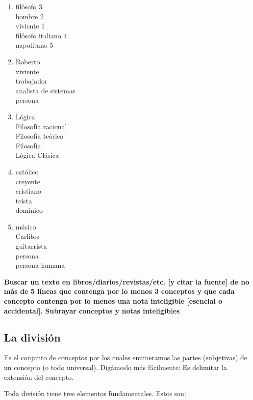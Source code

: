 \documentclass{article}
\begin{document}
\begin{enumerate}
    \item filósofo 3 \\
    hombre 2 \\
    viviente 1 \\
    filósofo italiano 4 \\
    napolitano  5 \\
                  
    \item Roberto \\
    viviente \\
    trabajador \\
    analista de sistemas \\
    persona \\
                  
    \item Lógica  \\
    Filosofía racional \\
    Filosofía teórica \\
    Filosofía \\
    Lógica Clásica \\
                  
    \item católico  \\
    creyente \\
    cristiano \\
    teísta \\
    dominico \\
                  
    \item músico  \\
    Carlitos \\
    guitarrista \\
    persona \\
    persona humana \\
\end{enumerate}

\noindent\textbf{Buscar un texto en libros/diarios/revistas/etc. [y citar la fuente] de no más de 5 líneas que contenga por lo menos 3 conceptos y que cada concepto contenga por lo menos una nota inteligible [esencial o accidental]. Subrayar conceptos y notas inteligibles} \par 

\newpage

\subsection{La división}
    Es el conjunto de conceptos por los cuales enumeramos las partes (subjetivas) de un concepto (o todo universal). Digámoslo más fácilmente: Es delimitar la extensión del concepto. \par 
    Toda división tiene tres elementos fundamentales. Estos son: \par
\end{document}
